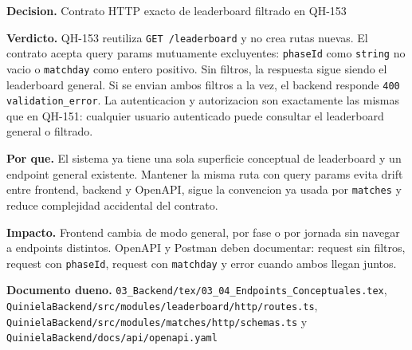\begin{docnote}
\textbf{Decision.} Contrato HTTP exacto de leaderboard filtrado en QH-153

\textbf{Verdicto.} QH-153 reutiliza \texttt{GET /leaderboard} y no crea rutas nuevas. El contrato acepta query params mutuamente excluyentes: \texttt{phaseId} como \texttt{string} no vacio o \texttt{matchday} como entero positivo. Sin filtros, la respuesta sigue siendo el leaderboard general. Si se envian ambos filtros a la vez, el backend responde \texttt{400 validation\_error}. La autenticacion y autorizacion son exactamente las mismas que en QH-151: cualquier usuario autenticado puede consultar el leaderboard general o filtrado.

\textbf{Por que.} El sistema ya tiene una sola superficie conceptual de leaderboard y un endpoint general existente. Mantener la misma ruta con query params evita drift entre frontend, backend y OpenAPI, sigue la convencion ya usada por \texttt{matches} y reduce complejidad accidental del contrato.

\textbf{Impacto.} Frontend cambia de modo general, por fase o por jornada sin navegar a endpoints distintos. OpenAPI y Postman deben documentar: request sin filtros, request con \texttt{phaseId}, request con \texttt{matchday} y error cuando ambos llegan juntos.

\textbf{Documento dueno.} \texttt{03\_Backend/tex/03\_04\_Endpoints\_Conceptuales.tex}, \texttt{QuinielaBackend/src/modules/leaderboard/http/routes.ts}, \texttt{QuinielaBackend/src/modules/matches/http/schemas.ts} y \texttt{QuinielaBackend/docs/api/openapi.yaml}
\end{docnote}


